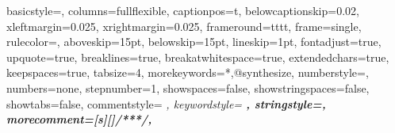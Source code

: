 %
%
\linespread{1.2}
\usepackage[english]{babel}
\usepackage{hyperref}

%
%
\usepackage{graphicx}
\usepackage[utf8]{inputenc}
\graphicspath{{images/}{../images/}}

%
%
\usepackage[top=1.5in, bottom=1.5in, right=1in, left=1in]{geometry}

\setlength{\headheight}{25.23402pt}

\usepackage{fancyhdr}
\pagestyle{fancy}
\fancyhf{} %
\fancyhead[LO,RE]{\authorname, \studentid\\{\vspace{-2pt}\scriptsize\doccdate}}
\fancyhead[LE,RO]{\leftmark\\{\vspace{-4pt}\scriptsize\unitdesc}}
\fancyfoot[LE,RO]{\thepage}

%
%
\usepackage{verbatim}
\usepackage{textcomp}
\usepackage{listings}
\usepackage{xcolor}
\usepackage{color}
\lstset
{
  basicstyle=\ttfamily\color{black}\scriptsize,
  columns=fullflexible,
  captionpos=t,
  belowcaptionskip=0.02\textwidth,
  xleftmargin=0.025\textwidth,
  xrightmargin=0.025\textwidth,
  frameround=tttt,
  frame=single,
  rulecolor=\color{black},
  aboveskip=15pt,
  belowskip=15pt,
  lineskip=1pt,
  fontadjust=true,
  upquote=true,
  breaklines=true,
  breakatwhitespace=true,
  extendedchars=true,
  keepspaces=true,
  tabsize=4,
  morekeywords={*,@synthesize},
  numberstyle=\scriptsize\ttfamily\color{gray},
  numbers=none,
  stepnumber=1,
  showspaces=false,
  showstringspaces=false,
  showtabs=false,
  commentstyle=\color{comment-color} \slshape \scriptsize,
  keywordstyle=\color{keyword-color} \bfseries,
  stringstyle=\color{string-color},
  morecomment=[s][\color{doxy-color}]{/**}{*/},
}

